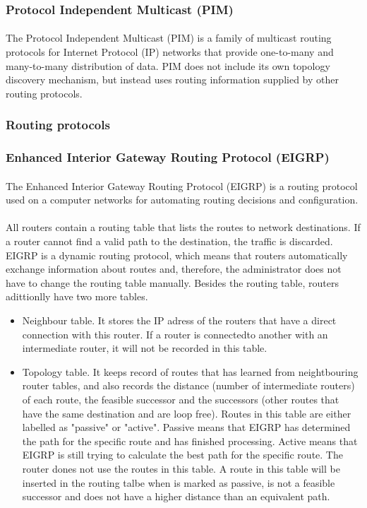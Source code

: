 \subsubsection*{Protocol Independent Multicast (PIM)\cite{PIMSM}\cite{PIMDM}}
\paragraph{}The Protocol Independent Multicast (PIM) is a family of multicast routing protocols for Internet Protocol (IP) networks that provide one-to-many and many-to-many distribution of data. PIM does not include its own topology discovery mechanism, but instead uses routing information supplied by other routing protocols.
\subsubsection{Routing protocols}
\subsubsection*{Enhanced Interior Gateway Routing Protocol (EIGRP)\cite{EIGRP}}
\paragraph{}The Enhanced Interior Gateway Routing Protocol (EIGRP) is a routing protocol used on a computer networks for automating routing decisions and configuration.
\paragraph{}All routers contain a routing table that lists the routes to network destinations. If a router cannot find a valid path to the destination, the traffic is discarded. EIGRP is a dynamic routing protocol, which means that routers automatically exchange information about routes and, therefore, the administrator does not have to change the routing table manually. Besides the routing table, routers adittionlly have two more tables.
\begin{itemize}
\item Neighbour table. It stores the IP adress of the routers that have a direct connection with this router. If a router is connectedto another with an intermediate router, it will not be recorded in this table.
\item Topology table. It keeps record of routes that has learned from neightbouring router tables, and also records the distance (number of intermediate routers) of each route, the feasible successor and the successors (other routes that have the same destination and are loop free). Routes in this table are either labelled as "passive" or "active". Passive means that EIGRP  has determined the path for the specific route and has finished processing. Active means that EIGRP is still trying to calculate the best path for the specific route. The router dones not use the routes in this table. A route in this table will be inserted in the routing talbe when is marked as passive, is not a feasible successor and does not have a higher distance than an equivalent path.
\end{itemize}
